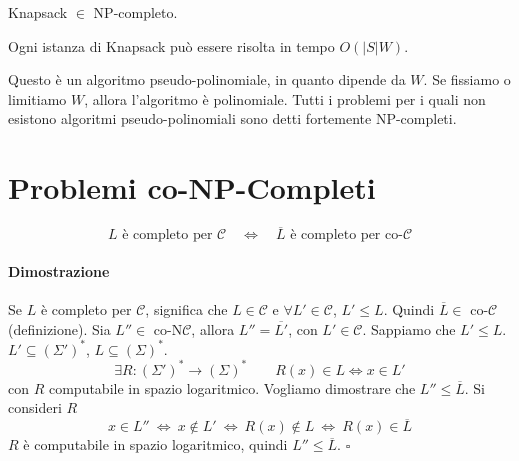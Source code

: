 Knapsack $\in$ NP-completo.

\begin{theorem}
    Ogni istanza di Knapsack può essere risolta in tempo $O(|S|W)$.
\end{theorem}
Questo è un algoritmo pseudo-polinomiale, in quanto dipende da $W$. Se fissiamo o limitiamo $W$, allora l'algoritmo è polinomiale. Tutti i problemi per i quali non esistono algoritmi pseudo-polinomiali sono detti fortemente NP-completi.



\section{Problemi co-NP-Completi}

\begin{center}
\end{center}

\begin{theorem}
    $$
        L \text{ è completo per } \mathcal{C}
        \quad \Leftrightarrow \quad
        \overline{L} \text{ è completo per co-} \mathcal{C}
    $$
\end{theorem}
\paragraph{Dimostrazione} Se $L$ è completo per $\mathcal{C}$, significa che $L\in\mathcal{C}$ e $\forall L'\in\mathcal{C}$, $L'\leq L$. Quindi $\overline{L}\in$ co-$\mathcal{C}$ (definizione). Sia $L''\in$ co-N$\mathcal{C}$, allora $L''=\overline{L'}$, con $L'\in\mathcal{C}$. Sappiamo che $L'\leq L$. $L'\subseteq(\Sigma')^*$, $L\subseteq(\Sigma)^*$.
$$
    \exists R : (\Sigma')^*\to(\Sigma)^* \qquad R(x)\in L \Leftrightarrow x\in L'
$$
con $R$ computabile in spazio logaritmico. Vogliamo dimostrare che $L''\leq\overline{L}$. Si consideri $R$
$$
    x\in L'' ~\Leftrightarrow~ 
    x\not\in L' ~\Leftrightarrow~
    R(x)\not\in L ~\Leftrightarrow~
    R(x)\in\overline{L}
$$
$R$ è computabile in spazio logaritmico, quindi $L''\leq\overline{L}$. \hfill$\square$\medskip 

